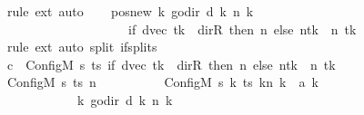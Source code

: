 \begin{isabellebody}
\ {\isacharparenleft}{\kern0pt}rule\ ext{\isacharparenright}{\kern0pt}\ auto\isanewline
\ \ \isamarkupfalse%
\ pos{\isacharunderscore}{\kern0pt}new{\isacharcolon}{\kern0pt}\ {\isachardoublequoteopen}{\isacharparenleft}{\kern0pt}{\isasymlambda}k{\isachardot}{\kern0pt}\ go{\isacharunderscore}{\kern0pt}dir\ {\isacharparenleft}{\kern0pt}{\isacharquery}{\kern0pt}d\ k{\isacharparenright}{\kern0pt}\ {\isacharparenleft}{\kern0pt}n\ k{\isacharparenright}{\kern0pt}{\isacharparenright}{\kern0pt}\isanewline
\ \ \ \ \ \ \ \ \ \ \ \ \ \ \ \ \ \ \ {\isacharequal}{\kern0pt}\ {\isacharparenleft}{\kern0pt}if\ dvec\ tk\ {\isacharequal}{\kern0pt}\ dir{\isachardot}{\kern0pt}R\ then\ n\ else\ n{\isacharparenleft}{\kern0pt}tk\ {\isacharcolon}{\kern0pt}{\isacharequal}{\kern0pt}\ n\ tk\ {\isacharminus}{\kern0pt}\ {}{\isacharparenright}{\kern0pt}{\isacharparenright}{\kern0pt}{\isachardoublequoteclose}\isanewline
\ \ \ \ \isamarkupfalse%
\ {\isacharparenleft}{\kern0pt}rule\ ext{\isacharparenright}{\kern0pt}\ {\isacharparenleft}{\kern0pt}auto\ split{\isacharcolon}{\kern0pt}\ if{\isacharunderscore}{\kern0pt}splits{\isacharparenright}{\kern0pt}\isanewline
\ \ \isamarkupfalse%
\ {\isacharquery}{\kern0pt}c{\isacharprime}{\kern0pt}{\isacharprime}{\kern0pt}\ {\isacharequal}{\kern0pt}\ {\isachardoublequoteopen}Config\isactrlsub M\ {\isacharquery}{\kern0pt}s{\isacharprime}{\kern0pt}\ ts\ {\isacharparenleft}{\kern0pt}if\ dvec\ tk\ {\isacharequal}{\kern0pt}\ dir{\isachardot}{\kern0pt}R\ then\ n\ else\ n{\isacharparenleft}{\kern0pt}tk\ {\isacharcolon}{\kern0pt}{\isacharequal}{\kern0pt}\ n\ tk\ {\isacharminus}{\kern0pt}\ {}{\isacharparenright}{\kern0pt}{\isacharparenright}{\kern0pt}{\isachardoublequoteclose}\isanewline
\ \ \isamarkupfalse%
\ {\isachardoublequoteopen}{\isacharparenleft}{\kern0pt}Config\isactrlsub M\ {\isacharquery}{\kern0pt}s\ ts\ n{\isacharcomma}{\kern0pt}\isanewline
\ \ \ \ \ \ \ \ \ \ Config\isactrlsub M\ {\isacharquery}{\kern0pt}s{\isacharprime}{\kern0pt}\ {\isacharparenleft}{\kern0pt}{\isasymlambda}k{\isachardot}{\kern0pt}\ {\isacharparenleft}{\kern0pt}ts\ k{\isacharparenright}{\kern0pt}{\isacharparenleft}{\kern0pt}n\ k\ {\isacharcolon}{\kern0pt}{\isacharequal}{\kern0pt}\ {\isacharquery}{\kern0pt}a\ k{\isacharparenright}{\kern0pt}{\isacharparenright}{\kern0pt}\isanewline
\ \ \ \ \ \ \ \ \ \ \ \ {\isacharparenleft}{\kern0pt}{\isasymlambda}k{\isachardot}{\kern0pt}\ go{\isacharunderscore}{\kern0pt}dir\ {\isacharparenleft}{\kern0pt}{\isacharquery}{\kern0pt}d\ k{\isacharparenright}{\kern0pt}\ {\isacharparenleft}{\kern0pt}n\ k{\isacharparenright}{\kern0pt}{\isacharparenright}{\kern0pt}{\isacharparenright}{\kern0pt}\isanewline

\end{isabellebody}
